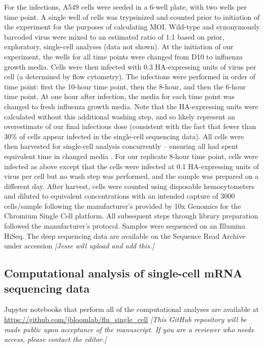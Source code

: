 \documentclass[9pt,lineno]{elife}
\newcommand{\jdbcomment}[1]{\emph{\color{red} [#1]}}
\begin{document}
For the infections, A549 cells were seeded in a 6-well plate, with two wells per time point. 
A single well of cells was trypsinized and counted prior to initiation of the experiment for the purposes of calculating MOI.
Wild-type and synonymously barcoded virus were mixed to an estimated ratio of 1:1 based on prior, exploratory, single-cell analyses (data not shown). 
At the initiation of our experiment, the wells for all time points were changed from D10 to influenza growth media.
Cells were then infected with 0.3 HA-expressing units of virus per cell (a determined by flow cytometry).
The infections were performed in order of time point: first the 10-hour time point, then the 8-hour, and then the 6-hour time point.
At one hour after infection, the media for each time point was changed to fresh influenza growth media.
Note that the HA-expressing units were calculated without this additional washing step, and so likely represent an overestimate of our final infectious dose (consistent with the fact that fewer than 30\% of cells appear infected in the single-cell sequencing data).
All cells were then harvested for single-cell analysis concurrently -- ensuring all had spent equivalent time in changed media .
For our replicate 8-hour time point, cells were infected as above except that the cells were infected at 0.1 HA-expressing units of virus per cell but no wash step was performed, and the sample was prepared on a different day.
After harvest, cells were counted using disposable hemocytometers and diluted to equivalent concentrations with an intended capture of 3000 cells/sample following the manufacturer's provided by 10x Genomics for the Chromium Single Cell platform.
All subsequent steps through library preparation followed the manufacturer's protocol.
Samples were sequenced on an Illumina HiSeq. 
The deep sequencing data are available on the Sequence Read Archive under accession \jdbcomment{Jesse will upload and add this.}

\subsection{Computational analysis of single-cell mRNA sequencing data}
Jupyter notebooks that perform all of the computational analyses are available at \url{https://github.com/jbloomlab/flu_single_cell} \jdbcomment{This GitHub repository will be made public upon acceptance of the manuscript. If you are a reviewer who needs access, please contact the editor.}
\end{document}
